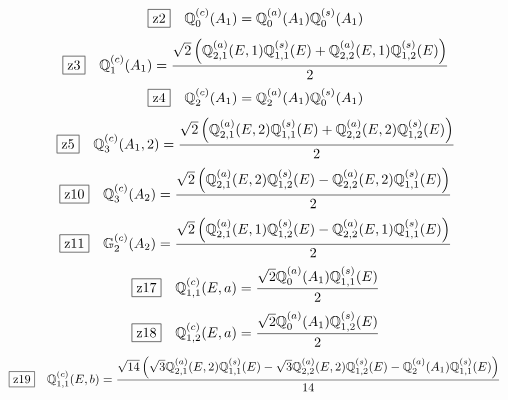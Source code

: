 \documentclass[fleqn,10pt,landscape]{jsarticle}
\begin{document}
\begin{dmath*}
\hspace*{3mm}\fbox{z2}\quad \mathbb{Q}_{0}^{(c)}(A_{1})=\mathbb{Q}_{0}^{(a)}(A_{1}) \mathbb{Q}_{0}^{(s)}(A_{1})
\end{dmath*}
\begin{dmath*}
\hspace*{3mm}\fbox{z3}\quad \mathbb{Q}_{1}^{(c)}(A_{1})=\frac{\sqrt{2} \left(\mathbb{Q}_{2,1}^{(a)}(E,1) \mathbb{Q}_{1,1}^{(s)}(E) + \mathbb{Q}_{2,2}^{(a)}(E,1) \mathbb{Q}_{1,2}^{(s)}(E)\right)}{2}
\end{dmath*}
\begin{dmath*}
\hspace*{3mm}\fbox{z4}\quad \mathbb{Q}_{2}^{(c)}(A_{1})=\mathbb{Q}_{2}^{(a)}(A_{1}) \mathbb{Q}_{0}^{(s)}(A_{1})
\end{dmath*}
\begin{dmath*}
\hspace*{3mm}\fbox{z5}\quad \mathbb{Q}_{3}^{(c)}(A_{1},2)=\frac{\sqrt{2} \left(\mathbb{Q}_{2,1}^{(a)}(E,2) \mathbb{Q}_{1,1}^{(s)}(E) + \mathbb{Q}_{2,2}^{(a)}(E,2) \mathbb{Q}_{1,2}^{(s)}(E)\right)}{2}
\end{dmath*}
\begin{dmath*}
\hspace*{3mm}\fbox{z10}\quad \mathbb{Q}_{3}^{(c)}(A_{2})=\frac{\sqrt{2} \left(\mathbb{Q}_{2,1}^{(a)}(E,2) \mathbb{Q}_{1,2}^{(s)}(E) - \mathbb{Q}_{2,2}^{(a)}(E,2) \mathbb{Q}_{1,1}^{(s)}(E)\right)}{2}
\end{dmath*}
\begin{dmath*}
\hspace*{3mm}\fbox{z11}\quad \mathbb{G}_{2}^{(c)}(A_{2})=\frac{\sqrt{2} \left(\mathbb{Q}_{2,1}^{(a)}(E,1) \mathbb{Q}_{1,2}^{(s)}(E) - \mathbb{Q}_{2,2}^{(a)}(E,1) \mathbb{Q}_{1,1}^{(s)}(E)\right)}{2}
\end{dmath*}
\begin{dmath*}
\hspace*{3mm}\fbox{z17}\quad \mathbb{Q}_{1,1}^{(c)}(E,a)=\frac{\sqrt{2} \mathbb{Q}_{0}^{(a)}(A_{1}) \mathbb{Q}_{1,1}^{(s)}(E)}{2}
\end{dmath*}
\begin{dmath*}
\hspace*{3mm}\fbox{z18}\quad \mathbb{Q}_{1,2}^{(c)}(E,a)=\frac{\sqrt{2} \mathbb{Q}_{0}^{(a)}(A_{1}) \mathbb{Q}_{1,2}^{(s)}(E)}{2}
\end{dmath*}
\begin{dmath*}
\hspace*{3mm}\fbox{z19}\quad \mathbb{Q}_{1,1}^{(c)}(E,b)=\frac{\sqrt{14} \left(\sqrt{3} \mathbb{Q}_{2,1}^{(a)}(E,2) \mathbb{Q}_{1,1}^{(s)}(E) - \sqrt{3} \mathbb{Q}_{2,2}^{(a)}(E,2) \mathbb{Q}_{1,2}^{(s)}(E) - \mathbb{Q}_{2}^{(a)}(A_{1}) \mathbb{Q}_{1,1}^{(s)}(E)\right)}{14}
\end{dmath*}
\end{document}
